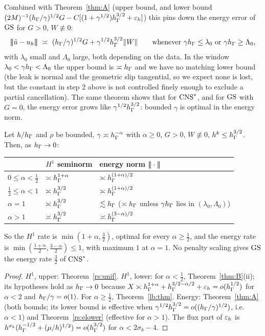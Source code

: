 Combined with Theorem~\ref{thm:A} (upper bound, and lower bound $(2M)^{-1}(h_\Gamma/\gamma)^{1/2}G-C[(1+\gamma^{1/2})h_\Gamma^{3/2}+\varepsilon_h]$) this pins down the energy error of $\mathrm{GS}$ for $G>0$, $W\not\equiv0$:
\[
\tnorm{\ut-u_h}\ \asymp\ (\hG/\gamma)^{1/2}G+\gamma^{1/2}\hG^{3/2}\norm W\qquad\text{whenever }\gamma\hG\le\lambda_0\text{ or }\gamma\hG\ge\Lambda_0,
\]
with $\lambda_0$ small and $\Lambda_0$ large, both depending on the data. In the window $\lambda_0<\gamma h_\Gamma<\Lambda_0$ the upper bound is $\asymp h_\Gamma$ and we have no matching lower bound (the leak is normal and the geometric slip tangential, so we expect none is lost, but the constant in step 2 above is not controlled finely enough to exclude a partial cancellation). The same theorem shows that for $\mathrm{CNS}^\ast$, and for $\mathrm{GS}$ with $G=0$, the energy error grows like $\gamma^{1/2}h_\Gamma^{3/2}$: bounded $\gamma$ is optimal in the energy norm.

\begin{corollary}\label{rs:rates}
Let $h/h_\Gamma$ and $\rho$ be bounded, $\gamma\asymp h_\Gamma^{-\alpha}$ with $\alpha\ge0$, $G>0$, $W\not\equiv0$, $h^k\le h_\Gamma^{3/2}$. Then, as $h_\Gamma\to0$:
\begin{center}
\begin{tabular}{lll}
\toprule
& $H^1$ seminorm & energy norm $|\!|\!|\cdot|\!|\!|$\\
\midrule
$0\le\alpha<\frac12$ & $\asymp h_\Gamma^{1+\alpha}$ & $\asymp h_\Gamma^{(1+\alpha)/2}$\\
$\frac12\le\alpha<1$ & $\asymp h_\Gamma^{3/2}$ & $\asymp h_\Gamma^{(1+\alpha)/2}$\\
$\alpha=1$ & $\asymp h_\Gamma^{3/2}$ & $\lesssim h_\Gamma$ ($\asymp h_\Gamma$ unless $\gamma h_\Gamma$ lies in $(\lambda_0,\Lambda_0)$)\\
$\alpha>1$ & $\asymp h_\Gamma^{3/2}$ & $\asymp h_\Gamma^{(3-\alpha)/2}$\\
\bottomrule
\end{tabular}
\end{center}
So the $H^1$ rate is $\min(1+\alpha,\frac32)$, optimal for every $\alpha\ge\frac12$, and the energy rate is $\min(\frac{1+\alpha}2,\frac{3-\alpha}2)\le1$, with maximum $1$ at $\alpha=1$. No penalty scaling gives $\mathrm{GS}$ the energy rate $\frac32$ of $\mathrm{CNS}^\ast$.
\end{corollary}

\begin{proof}
$H^1$, upper: Theorem~\ref{rs:unif}. $H^1$, lower: for $\alpha<\frac12$, Theorem~\ref{thm:B}(ii); its hypotheses hold as $h_\Gamma\to0$ because $X\asymp h_\Gamma^{1+\alpha}+h_\Gamma^{3/2-\alpha/2}+\varepsilon_h=o(h_\Gamma^{1/2})$ for $\alpha<2$ and $h_\Gamma/\gamma=o(1)$. For $\alpha\ge\frac12$, Theorem~\ref{lb:thm}. Energy: Theorem~\ref{thm:A} (both bounds; its lower bound is effective when $\gamma^{1/2}h_\Gamma^{3/2}=o((h_\Gamma/\gamma)^{1/2})$, i.e.\ $\alpha<1$) and Theorem~\ref{rs:elower} (effective for $\alpha>1$). The flux part of $\varepsilon_h$ is $h^{\sigma_k}(h_\Gamma^{-1/2}+(\mu/h)^{1/2})=o(h_\Gamma^{3/2})$ for $\alpha<2\sigma_k-4$.
\end{proof}

